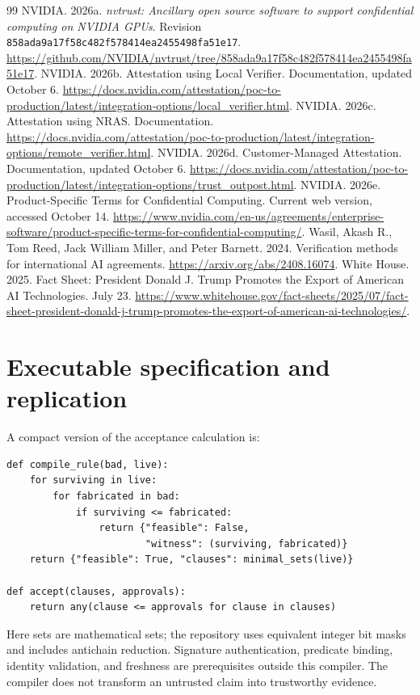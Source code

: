 \documentclass[11pt,letterpaper]{article}
\begin{document}
\begin{thebibliography}{99}
 NVIDIA. 2026a. \emph{nvtrust: Ancillary open source software to support confidential computing on NVIDIA GPUs}. Revision \nolinkurl{858ada9a17f58c482f578414ea2455498fa51e17}. \url{https://github.com/NVIDIA/nvtrust/tree/858ada9a17f58c482f578414ea2455498fa51e17}.
 NVIDIA. 2026b. Attestation using Local Verifier. Documentation, updated October 6. \url{https://docs.nvidia.com/attestation/poc-to-production/latest/integration-options/local_verifier.html}.
 NVIDIA. 2026c. Attestation using NRAS. Documentation. \url{https://docs.nvidia.com/attestation/poc-to-production/latest/integration-options/remote_verifier.html}.
 NVIDIA. 2026d. Customer-Managed Attestation. Documentation, updated October 6. \url{https://docs.nvidia.com/attestation/poc-to-production/latest/integration-options/trust_outpost.html}.
 NVIDIA. 2026e. Product-Specific Terms for Confidential Computing. Current web version, accessed October 14. \url{https://www.nvidia.com/en-us/agreements/enterprise-software/product-specific-terms-for-confidential-computing/}.
 Wasil, Akash R., Tom Reed, Jack William Miller, and Peter Barnett. 2024. Verification methods for international AI agreements. \url{https://arxiv.org/abs/2408.16074}.
 White House. 2025. Fact Sheet: President Donald J. Trump Promotes the Export of American AI Technologies. July 23. \url{https://www.whitehouse.gov/fact-sheets/2025/07/fact-sheet-president-donald-j-trump-promotes-the-export-of-american-ai-technologies/}.
\end{thebibliography}

\appendix
\section{Executable specification and replication}
A compact version of the acceptance calculation is:
\begin{verbatim}
def compile_rule(bad, live):
    for surviving in live:
        for fabricated in bad:
            if surviving <= fabricated:
                return {"feasible": False,
                        "witness": (surviving, fabricated)}
    return {"feasible": True, "clauses": minimal_sets(live)}

def accept(clauses, approvals):
    return any(clause <= approvals for clause in clauses)
\end{verbatim}
Here sets are mathematical sets; the repository uses equivalent integer bit masks and includes antichain reduction. Signature authentication, predicate binding, identity validation, and freshness are prerequisites outside this compiler. The compiler does not transform an untrusted claim into trustworthy evidence.
\end{document}
